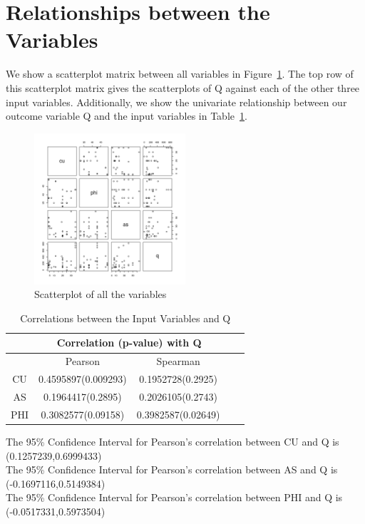 \documentclass[a4paper,12pt, english]{article}
\begin{document}
\section{Relationships between the Variables}
We show a scatterplot matrix between all variables in Figure~\ref{fig:pairs}. The top row of this scatterplot matrix gives the scatterplots of Q against each of the other three input variables. Additionally, we show the univariate relationship between our outcome variable Q and the input variables in Table~\ref{table:corr}.
\begin{figure}[!htbp]
  \centering
  \includegraphics[width=0.5\textwidth]{pairs}
  \caption{Scatterplot of all the variables}
  \label{fig:pairs}
\end{figure}


\begin{table}[!htbp]
\centering

\begin{tabular}{*5c}
\toprule
&  \multicolumn{2}{c}{Correlation (p-value) with Q} \\
\midrule
{}   & Pearson   & Spearman    \\
CU & 0.4595897(0.009293) & 0.1952728(0.2925)   \\
AS   & 0.1964417(0.2895)   & 0.2026105(0.2743)  \\
PHI & 0.3082577(0.09158)  & 0.3982587(0.02649)  \\
\bottomrule
\end{tabular}
\caption{Correlations between the Input Variables and Q}
\label{table:corr}
\end{table}




The 95\% Confidence Interval for Pearson's correlation between CU and Q is (0.1257239,0.6999433)\\
The 95\% Confidence Interval for Pearson's correlation between AS and Q is (-0.1697116,0.5149384)\\
The 95\% Confidence Interval for Pearson's correlation between PHI and Q is (-0.0517331,0.5973504)\\



\end{document}

